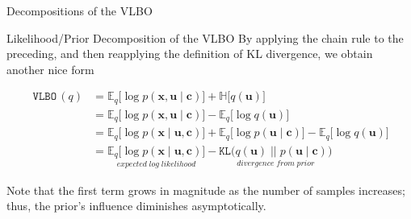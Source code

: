 \documentclass[10pt]{beamer}
\newcommand{\+}[1]{\ensuremath{{\boldsymbol #1}}} %
\newcommand{\cond}{\; | \;}
\newcommand{\E}{\mathbb{E}}
\newcommand{\VLBO}{\,\texttt{VLBO}\,}
\begin{document}
\begin{frame}{Decompositions of the VLBO}
\begin{block}{Likelihood/Prior Decomposition of the VLBO}
By applying the chain rule to the preceding, and then reapplying the definition of KL divergence, we obtain another nice form

 \begin{align*}
\VLBO(q) &=   \E_q \big[ \log p(\+x, \+u \cond \+c) \big]  +  \mathbb{H} \big[q(\+u) \big] \\
& =  \E_q \big[ \log p(\+x, \+u \cond \+c) \big] - \E_q \big[ \log q(\+u) \big] \\
& =  \E_q \big[ \log p(\+x \cond \+u, \+c) \big] + \E_q \big[ \log p(\+u \cond \+c) \big] - \E_q \big[ \log q(\+u) \big] \\
&= \underset{expected \; log \; likelihood}{\E_q \big[ \log p(\+x \cond \+u, \+c) \big]}  -  \underset{divergence \; from \; prior}{\texttt{KL} \big(q(\+u ) \; || \; p(\+u \cond \+c)\big)}
\end{align*}
\end{block} 

 

Note that the first term grows in magnitude as the number of samples increases; thus, the prior's influence diminishes asymptotically.

\end{frame}
\end{document}
